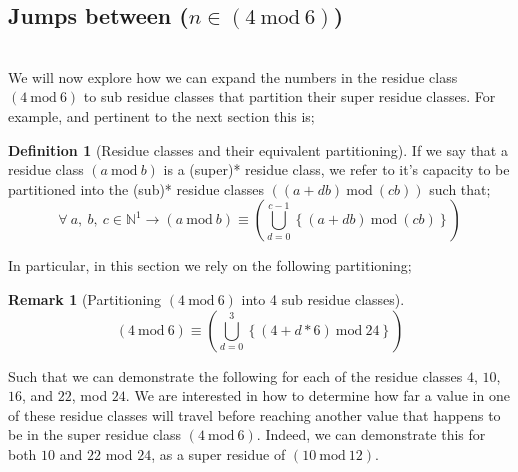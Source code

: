 \documentclass[12pt,a4paper]{amsart}
\numberwithin{equation}{section}
\theoremstyle{plain}
\theoremstyle{definition}
\newtheorem{Def}[Th]{Definition}
\newtheorem{Rem}[Th]{Remark}
\begin{document}
\subsection{Jumps between ($n \in \left ( 4\:\mathrm{mod}\:6 \right )$)} \hfill\\

We will now explore how we can expand the numbers in the residue class $\left ( 4\:\mathrm{mod}\:6 \right )$ to sub residue classes that partition their super residue classes. For example, and pertinent to the next section this is;

\begin{Def}[Residue classes and their equivalent partitioning]
If we say that a residue class $\left ( a\:\mathrm{mod}\:b \right )$ is a (super)* residue class, we refer to it's capacity to be partitioned into the (sub)* residue classes $\left ( \left (a+db  \right )\:\mathrm{mod}\:\left (cb  \right ) \right )$ such that;
\begin{equation}
\forall \:a\mathrm{,}\:b\mathrm{,}\:c \in \mathbb{N}^{1} \rightarrow \left ( a\:\mathrm{mod}\:b \right ) \equiv \left (\bigcup_{d=0}^{c-1} \left \{ \left (a+db  \right )\:\mathrm{mod}\:\left (cb  \right ) \right \}  \right )
\end{equation}
\end{Def}

In particular, in this section we rely on the following partitioning; 

\begin{Rem}[Partitioning $\left ( 4\:\mathrm{mod}\:6 \right )$ into 4 sub residue classes]
\begin{equation}
\left ( 4\:\mathrm{mod}\:6 \right ) \equiv \left (\bigcup_{d=0}^{3} \left \{ \left (4+d*6  \right )\:\mathrm{mod}\:24 \right \}  \right )
\end{equation}
\end{Rem}

Such that we can demonstrate the following for each of the residue classes $4$, $10$, $16$, and $22$, mod $24$. We are interested in how to determine how far a value in one of these residue classes will travel before reaching another value that happens to be in the super residue class $\left ( 4\:\mathrm{mod}\:6 \right )$. Indeed, we can demonstrate this for both $10$ and $22$ mod $24$, as a super residue of $\left ( 10\:\mathrm{mod}\:12 \right )$.
\end{document}
